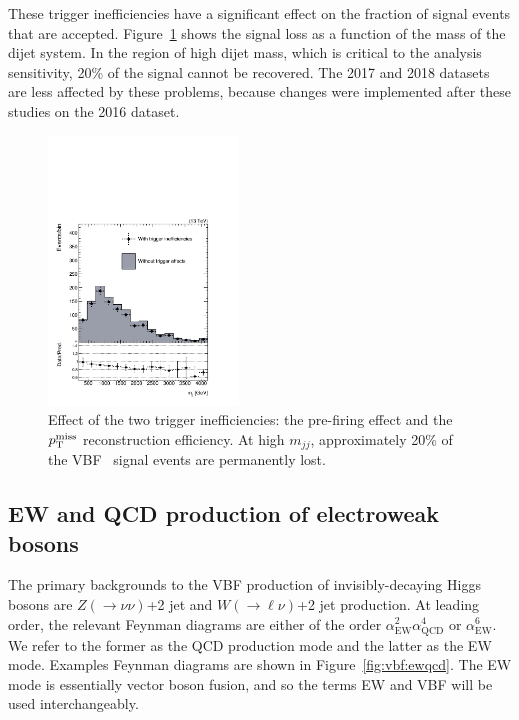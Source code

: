 These trigger inefficiencies have a significant effect on the fraction of signal events that are accepted.
Figure~\ref{fig:vbf:trigeffect} shows the signal loss as a function of the mass of the dijet system.
In the region of high dijet mass, which is critical to the analysis sensitivity, 20\% of the signal cannot be recovered.
The 2017 and 2018 datasets are less affected by these problems, because changes were implemented after these studies on the 2016 dataset.

\begin{figure}[]
    \begin{center}
        \includegraphics[width=0.45\textwidth]{figures/vbf/triggers/mjjsignal_jot12Mass.pdf}
        \caption{Effect of the two trigger inefficiencies: the pre-firing effect and the $p_\mathrm{T}^\mathrm{miss}$ reconstruction efficiency.
                 At high $m_{jj}$, approximately 20\% of the VBF \hinv~signal events are permanently lost.}
        \label{fig:vbf:trigeffect}  
    \end{center}
\end{figure}

\subsection{EW and QCD production of electroweak bosons}

The primary backgrounds to the VBF production of invisibly-decaying Higgs bosons are $Z(\rightarrow\nu\nu)$+2 jet and $W(\rightarrow\ell\nu)$+2 jet production.
At leading order, the relevant Feynman diagrams are either of the order $\alpha_\mathrm{EW}^2 \alpha_\mathrm{QCD}^4$ or $\alpha_\mathrm{EW}^6$. 
We refer to the former as the QCD production mode and the latter as the EW mode. 
Examples Feynman diagrams are shown in Figure~\ref{fig:vbf:ewqcd}.
The EW mode is essentially vector boson fusion, and so the terms EW and VBF will be used interchangeably. 


